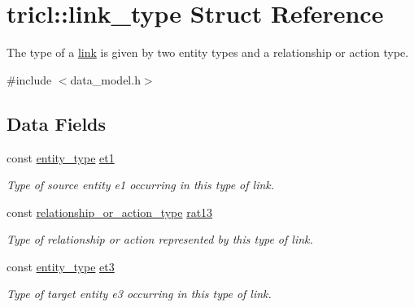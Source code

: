 \hypertarget{structtricl_1_1link__type}{}\section{tricl\+:\+:link\+\_\+type Struct Reference}
\label{structtricl_1_1link__type}


The type of a \hyperlink{structtricl_1_1link}{link} is given by two entity types and a relationship or action type.  




{\ttfamily \#include $<$data\+\_\+model.\+h$>$}

\subsection*{Data Fields}
\begin{DoxyCompactItemize}
\item 
\mbox{\label{structtricl_1_1link__type_a9cb3cda7790fc4d697f6274cf0af708c}} 
const \hyperlink{namespacetricl_afd4de3aedd5e48cf955f03457386e98f}{entity\+\_\+type} \hyperlink{structtricl_1_1link__type_a9cb3cda7790fc4d697f6274cf0af708c}{et1}
\begin{DoxyCompactList}\small\item\em Type of source entity e1 occurring in this type of link. \end{DoxyCompactList}\item 
\mbox{\label{structtricl_1_1link__type_ab567b0eff4a068b28141da69c810770d}} 
const \hyperlink{namespacetricl_a2d01894944fb58a8fedc0912a48d13f8}{relationship\+\_\+or\+\_\+action\+\_\+type} \hyperlink{structtricl_1_1link__type_ab567b0eff4a068b28141da69c810770d}{rat13}
\begin{DoxyCompactList}\small\item\em Type of relationship or action represented by this type of link. \end{DoxyCompactList}\item 
\mbox{\label{structtricl_1_1link__type_ae89141e8c4719830d32c0d7fe95a184f}} 
const \hyperlink{namespacetricl_afd4de3aedd5e48cf955f03457386e98f}{entity\+\_\+type} \hyperlink{structtricl_1_1link__type_ae89141e8c4719830d32c0d7fe95a184f}{et3}
\begin{DoxyCompactList}\small\item\em Type of target entity e3 occurring in this type of link. \end{DoxyCompactList}\end{DoxyCompactItemize}
